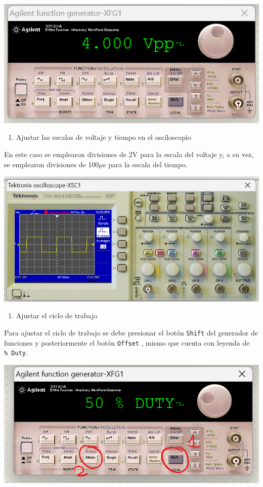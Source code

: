 \documentclass[
]{article}
\providecommand{\tightlist}{%
  \setlength{\itemsep}{0pt}\setlength{\parskip}{0pt}}
\begin{document}
\includegraphics{2023-05-18-20-47-36.png}

\begin{enumerate}
\def\labelenumi{\arabic{enumi}.}
\setcounter{enumi}{3}
\tightlist
\item
  Ajustar las escalas de voltaje y tiempo en el osciloscopio
\end{enumerate}

En este caso se emplearon divisiones de 2V para la escala del voltaje y,
a su vez, se emplearon divisiones de 100\(\mu\)s para la escala del
tiempo.

\includegraphics{2023-05-18-20-59-38.png}

\begin{enumerate}
\def\labelenumi{\arabic{enumi}.}
\setcounter{enumi}{4}
\tightlist
\item
  Ajustar el ciclo de trabajo
\end{enumerate}

Para ajustar el ciclo de trabajo se debe presionar el botón
\texttt{Shift} del generador de funciones y posteriormente el botón
\texttt{Offset} , mismo que cuenta con leyenda de \texttt{\%\ Duty}.

\includegraphics{2023-05-18-21-06-09.png}
\end{document}
